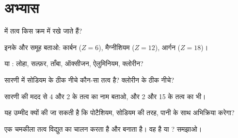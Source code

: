 \section{अभ्यास}

\begin{exercise}[$\star$]\label{exo:g9:periodic-table-first-look:1}
 में तत्व किस क्रम में रखे जाते हैं?
\end{exercise}

\begin{exercise}[$\star$]\label{exo:g9:periodic-table-first-look:2}
इनके  और समूह बताओ: कार्बन ($Z = 6$), मैग्नीशियम ($Z = 12$),
आर्गन ($Z = 18$)।
\end{exercise}

\begin{exercise}[$\star$]\label{exo:g9:periodic-table-first-look:3}
 या : लोहा, सल्फ़र, ताँबा, ऑक्सीजन, ऐलुमिनियम, क्लोरीन?
\end{exercise}

\begin{exercise}[$\star$]\label{exo:g9:periodic-table-first-look:4}
सारणी में सोडियम के ठीक नीचे कौन-सा तत्व है? क्लोरीन के ठीक नीचे?
\end{exercise}

\begin{exercise}[$\star\star$]\label{exo:g9:periodic-table-first-look:5}
सारणी की मदद से  4 और  2 के तत्व का नाम बताओ, और  2 और
 15 के तत्व का भी।
\end{exercise}

\begin{exercise}[$\star\star$]\label{exo:g9:periodic-table-first-look:6}
यह उम्मीद क्यों की जा सकती है कि पोटैशियम, सोडियम की तरह, पानी के साथ अभिक्रिया करेगा?
\end{exercise}

\begin{exercise}[$\star\star$]\label{exo:g9:periodic-table-first-look:7}
एक चमकीला तत्व विद्युत का चालन करता है और   बनाता है। वह
 है या ? समझाओ।
\end{exercise}

